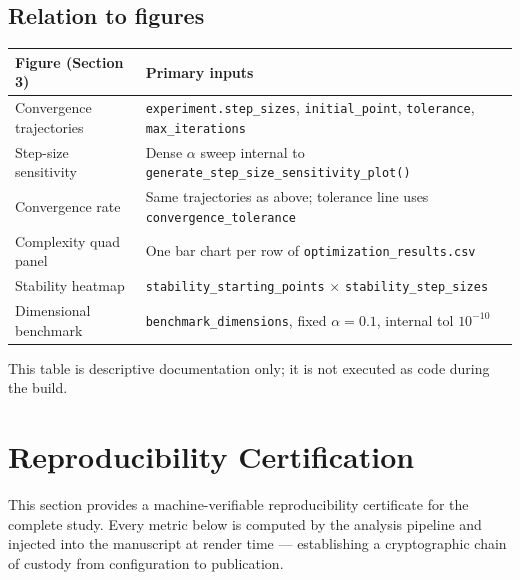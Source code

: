 \documentclass[
]{article}
\newcounter{none} %
\begin{document}
\subsection{Relation to figures}\label{relation-to-figures}

{\def\LTcaptype{none} %
\begin{longtable}[]{@{}
  >{\raggedright\arraybackslash}p{}
  >{\raggedright\arraybackslash}p{}@{}}
\toprule\noalign{}
\begin{minipage}[b]{\linewidth}\raggedright
Figure (Section 3)
\end{minipage} & \begin{minipage}[b]{\linewidth}\raggedright
Primary inputs
\end{minipage} \\
\midrule\noalign{}
\endhead
\bottomrule\noalign{}
\endlastfoot
Convergence trajectories & \texttt{experiment.step\_sizes},
\texttt{initial\_point}, \texttt{tolerance}, \texttt{max\_iterations} \\
Step-size sensitivity & Dense \(\alpha\) sweep internal to
\texttt{generate\_step\_size\_sensitivity\_plot()} \\
Convergence rate & Same trajectories as above; tolerance line uses
\texttt{convergence\_tolerance} \\
Complexity quad panel & One bar chart per row of
\texttt{optimization\_results.csv} \\
Stability heatmap & \texttt{stability\_starting\_points} \(\times\)
\texttt{stability\_step\_sizes} \\
Dimensional benchmark & \texttt{benchmark\_dimensions}, fixed
\(\alpha=0.1\), internal tol \(10^{-10}\) \\
\end{longtable}
}

This table is descriptive documentation only; it is not executed as code
during the build.

\newpage

\section{Reproducibility
Certification}\label{reproducibility-certification}

This section provides a machine-verifiable reproducibility certificate
for the complete study. Every metric below is computed by the analysis
pipeline and injected into the manuscript at render time ---
establishing a cryptographic chain of custody from configuration to
publication.
\end{document}
